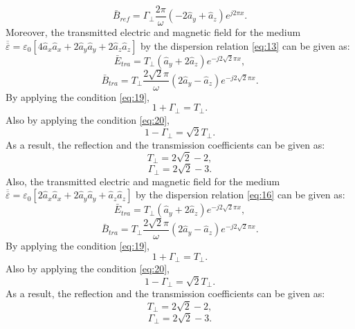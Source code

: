 \documentclass[11pt]{amsart}
\begin{document}
\begin{enumerate}
\begin{equation}
\bar{B}_{ref}=\Gamma_{\bot}\frac{2 \pi}{\omega}(-2\hat{a}_y + \hat{a}_z)e^{j 2 \pi x}.
\end{equation}
Moreover, the transmitted electric and magnetic field for the medium $\overline{\overline{\varepsilon}}=\varepsilon_0 \left [ 4\hat{a}_x \hat{a}_x +2\hat{a}_y \hat{a}_y +2\hat{a}_z \hat{a}_z \right ]$ by the dispersion relation \ref{eq:13} can be given as:
\begin{equation}
\bar{E}_{tra}=T_{\bot}(\hat{a}_y +2 \hat{a}_z)e^{-j 2 \sqrt{2} \pi x},
\end{equation}
\begin{equation}
\bar{B}_{tra}=T_{\bot}\frac{2 \sqrt{2} \pi}{\omega}(2\hat{a}_y - \hat{a}_z)e^{-j 2 \sqrt{2} \pi x}.
\end{equation}
By applying the condition \ref{eq:19},
\begin{equation}
1+\Gamma_{\bot}=T_{\bot}.
\end{equation}
Also by applying the condition \ref{eq:20},
\begin{equation}
1-\Gamma_{\bot}= \sqrt{2}T_{\bot}.
\end{equation}
As a result, the reflection and the transmission coefficients can be given as:
\begin{equation}
T_{\bot}=2\sqrt{2}-2,
\end{equation}
\begin{equation}
\Gamma_{\bot}=2\sqrt{2}-3.
\end{equation}
Also, the transmitted electric and magnetic field for the medium $\overline{\overline{\varepsilon}}=\varepsilon_0 \left [ 2\hat{a}_x \hat{a}_x +2\hat{a}_y \hat{a}_y +\hat{a}_z \hat{a}_z \right ]$ by the dispersion relation \ref{eq:16} can be given as:
\begin{equation}
\bar{E}_{tra}=T_{\bot}(\hat{a}_y +2 \hat{a}_z)e^{-j 2 \sqrt{2} \pi x},
\end{equation}
\begin{equation}
\bar{B}_{tra}=T_{\bot}\frac{2 \sqrt{2} \pi}{\omega}(2\hat{a}_y - \hat{a}_z)e^{-j 2 \sqrt{2} \pi x}.
\end{equation}
By applying the condition \ref{eq:19},
\begin{equation}
1+\Gamma_{\bot}=T_{\bot}.
\end{equation}
Also by applying the condition \ref{eq:20},
\begin{equation}
1-\Gamma_{\bot}= \sqrt{2}T_{\bot}.
\end{equation}
As a result, the reflection and the transmission coefficients can be given as:
\begin{equation}
T_{\bot}=2\sqrt{2}-2,
\end{equation}
\begin{equation}
\Gamma_{\bot}=2\sqrt{2}-3.
\end{equation}
\end{enumerate}


\end{document}
